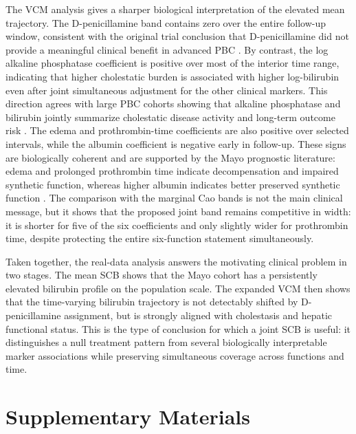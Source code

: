 \documentclass[12pt]{article} %
\theoremstyle{definition}
\begin{document}
The VCM analysis gives a sharper biological interpretation of the elevated
mean trajectory. The D-penicillamine band contains zero over the entire
follow-up window, consistent with the original trial conclusion that
D-penicillamine did not provide a meaningful clinical benefit in advanced PBC
\citep{Dickson1985,Lindor2009,Lindor2019}. By contrast, the log alkaline
phosphatase coefficient is positive over most of the interior time range,
indicating that higher cholestatic burden is associated with higher
log-bilirubin even after joint simultaneous adjustment for the other clinical
markers. This direction agrees with large PBC cohorts showing that alkaline
phosphatase and bilirubin jointly summarize cholestatic disease activity and
long-term outcome risk \citep{Lammers2014,Carbone2016}. The edema and
prothrombin-time coefficients are also positive over selected intervals, while
the albumin coefficient is negative early in follow-up. These signs are
biologically coherent and are supported by the Mayo prognostic literature:
edema and prolonged prothrombin time indicate decompensation and impaired
synthetic function, whereas higher albumin indicates better preserved synthetic
function \citep{Dickson1989,Murtaugh1994,KaplanGershwin2005}. The
comparison with the marginal Cao bands is not the main clinical message, but it
shows that the proposed joint band remains competitive in width: it is shorter
for five of the six coefficients and only slightly wider for prothrombin time,
despite protecting the entire six-function statement simultaneously.

Taken together, the real-data analysis answers the motivating clinical problem
in two stages. The mean SCB shows that the Mayo cohort has a persistently
elevated bilirubin profile on the population scale. The expanded VCM then
shows that the time-varying bilirubin trajectory is not detectably shifted by
D-penicillamine assignment, but is strongly aligned with cholestasis and
hepatic functional status. This is the type of conclusion for which a joint
SCB is useful: it distinguishes a null treatment pattern from several
biologically interpretable marker associations while preserving simultaneous
coverage across functions and time.

\section*{Supplementary Materials}
\end{document}
